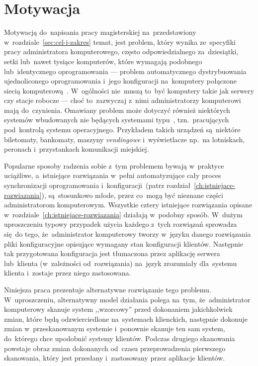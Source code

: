 \documentclass[thesis]{subfiles}
\begin{document}

\section{Motywacja}

Motywacją do~napisania pracy magisterskiej na~przedstawiony w~rozdziale~\ref{sec:cel-i-zakres} temat, jest problem, który wynika ze~specyfiki pracy administratora komputerowego, często odpowiedzialnego za~dziesiątki, setki lub~nawet tysiące komputerów, które wymagają podobnego lub~identycznego oprogramowania --- problem automatycznego dystrybuowania ujednoliconego oprogramowania i~jego konfiguracji na~komputery połączone siecią komputerową~\cite{so-problem-intro}. W~ogólności nie~muszą to~być komputery takie jak serwery czy stacje robocze --- choć to~zazwyczaj z~nimi administratorzy komputerowi mają do~czynienia. Omawiany problem może dotyczyć również niektórych systemów wbudowanych nie będących systemami typu~\mbox{}, tzn.~pracujących pod~kontrolą systemu operacyjnego. Przykładem takich urządzeń są~niektóre biletomaty, bankomaty, maszyny \emph{vendingowe} i~wyświetlacze np.~na lotniskach, peronach i~przystankach komunikacji miejskiej.

Popularne sposoby radzenia sobie z~tym problemem bywają w~praktyce uciążliwe, a~istniejące rozwiązania w~pełni automatyzujące cały proces synchronizacji oprogramowania i~konfiguracji~(patrz rozdział~\ref{ch:istniejace-rozwiazania}), są~stosunkowo młode, przez co~mogą być nieznane części administratorom komputerowym. Wszystkie cztery istniejące rozwiązania opisane w~rozdziale~\ref{ch:istniejace-rozwiazania} działają w~podobny sposób. W~dużym uproszczeniu typowy przypadek użycia każdego z~tych rozwiązań sprowadza się~do tego, że~administrator komputerowy tworzy w~języku danego rozwiązania pliki konfiguracyjne opisujące wymagany stan konfiguracji klientów. Następnie tak przygotowana konfiguracja jest tłumaczona przez aplikację serwera lub~klienta (w~zależności od~rozwiązania) na~język zrozumiały dla~systemu klienta i~zostaje przez niego zastosowana.

Niniejsza praca prezentuje alternatywne rozwiązanie tego problemu. W~uproszczeniu, alternatywny model działania polega na~tym, że~administrator komputerowy skanuje system ,,wzorcowy'' przed dokonaniem jakichkolwiek zmian, które będą odzwierciedlone na~systemach klienckich, następnie dokonuje zmian w~przeskanowanym systemie i~ponownie skanuje ten sam system, do~którego chce upodobnić systemy klientów. Podczas drugiego skanowania powstaje obraz zmian dokonanych od~czasu przeprowadzenia pierwszego skanowania, który jest przesłany i~zastosowany przez aplikacje klientów.
\end{document}
